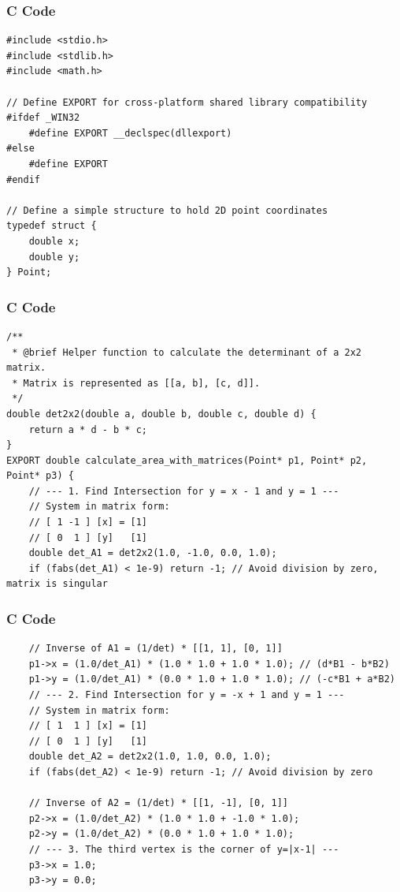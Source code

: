 \documentclass{beamer}
\begin{document}
\begin{frame}[fragile]
\frametitle{C Code}
\begin{lstlisting}
#include <stdio.h>
#include <stdlib.h>
#include <math.h>

// Define EXPORT for cross-platform shared library compatibility
#ifdef _WIN32
    #define EXPORT __declspec(dllexport)
#else
    #define EXPORT
#endif

// Define a simple structure to hold 2D point coordinates
typedef struct {
    double x;
    double y;
} Point;
\end{lstlisting}    
\end{frame}
\begin{frame}[fragile]  
\frametitle{C Code }
\begin{lstlisting}
/**
 * @brief Helper function to calculate the determinant of a 2x2 matrix.
 * Matrix is represented as [[a, b], [c, d]].
 */
double det2x2(double a, double b, double c, double d) {
    return a * d - b * c;
}
EXPORT double calculate_area_with_matrices(Point* p1, Point* p2, Point* p3) {
    // --- 1. Find Intersection for y = x - 1 and y = 1 ---
    // System in matrix form:
    // [ 1 -1 ] [x] = [1]
    // [ 0  1 ] [y]   [1]
    double det_A1 = det2x2(1.0, -1.0, 0.0, 1.0);
    if (fabs(det_A1) < 1e-9) return -1; // Avoid division by zero, matrix is singular
\end{lstlisting}    
\end{frame}
\begin{frame}[fragile]
\frametitle{C Code }
\begin{lstlisting}
    // Inverse of A1 = (1/det) * [[1, 1], [0, 1]]
    p1->x = (1.0/det_A1) * (1.0 * 1.0 + 1.0 * 1.0); // (d*B1 - b*B2)
    p1->y = (1.0/det_A1) * (0.0 * 1.0 + 1.0 * 1.0); // (-c*B1 + a*B2)
    // --- 2. Find Intersection for y = -x + 1 and y = 1 ---
    // System in matrix form:
    // [ 1  1 ] [x] = [1]
    // [ 0  1 ] [y]   [1]
    double det_A2 = det2x2(1.0, 1.0, 0.0, 1.0);
    if (fabs(det_A2) < 1e-9) return -1; // Avoid division by zero

    // Inverse of A2 = (1/det) * [[1, -1], [0, 1]]
    p2->x = (1.0/det_A2) * (1.0 * 1.0 + -1.0 * 1.0);
    p2->y = (1.0/det_A2) * (0.0 * 1.0 + 1.0 * 1.0);
    // --- 3. The third vertex is the corner of y=|x-1| ---
    p3->x = 1.0;
    p3->y = 0.0;
\end{lstlisting}    
\end{frame}
\end{document}
